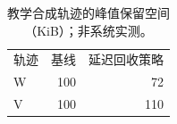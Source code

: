 \begin{table}[ht]
\centering
\caption{教学合成轨迹的峰值保留空间（KiB）；非系统实测。}\label{tab:space}
\begin{tabular}{lrr}
轨迹 & 基线 & 延迟回收策略 \\
W & 100 & 72 \\
V & 100 & 110
\end{tabular}
\end{table}
